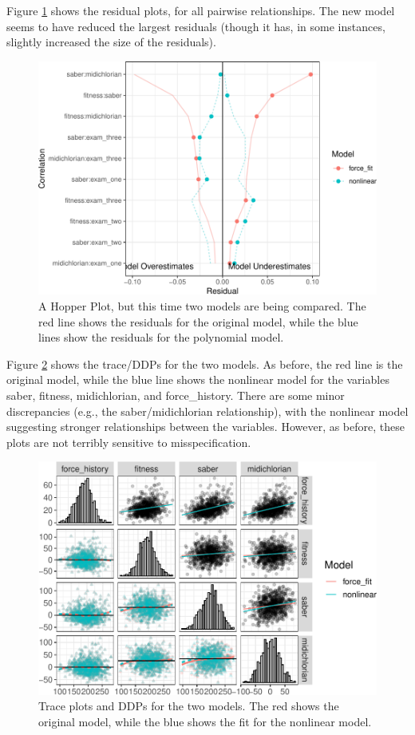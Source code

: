 \documentclass[
  english,
  doc]{apa6}
\begin{document}
Figure \ref{fig:hopperModcomp} shows the residual plots, for all pairwise relationships. The new model seems to have reduced the largest residuals (though it has, in some instances, slightly increased the size of the residuals).

\begin{figure}
\centering
\includegraphics{flexplavaan_draft_files/figure-latex/hopperModcomp-1.pdf}
\caption{\label{fig:hopperModcomp}A Hopper Plot, but this time two models are being compared. The red line shows the residuals for the original model, while the blue lines show the residuals for the polynomial model.}
\end{figure}

Figure \ref{fig:tracenl} shows the trace/DDPs for the two models. As before, the red line is the original model, while the blue line shows the nonlinear model for the variables saber, fitness, midichlorian, and force\_history. There are some minor discrepancies (e.g., the saber/midichlorian relationship), with the nonlinear model suggesting stronger relationships between the variables. However, as before, these plots are not terribly sensitive to misspecification.

\begin{figure}
\centering
\includegraphics{flexplavaan_draft_files/figure-latex/tracenl-1.pdf}
\caption{\label{fig:tracenl}Trace plots and DDPs for the two models. The red shows the original model, while the blue shows the fit for the nonlinear model.}
\end{figure}
\end{document}
